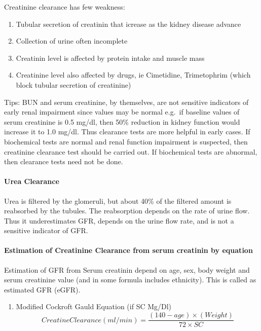 \documentclass[
  letterpaper,
  DIV=11,
  numbers=noendperiod]{scrreprt}
\let\oldparagraph\paragraph
\renewcommand{\paragraph}[1]{\oldparagraph{#1}\mbox{}}
\providecommand{\tightlist}{%
  \setlength{\itemsep}{0pt}\setlength{\parskip}{0pt}}\usepackage{longtable,booktabs,array}
\begin{document}
Creatinine clearance has few weakness:

\begin{enumerate}
\def\labelenumi{\arabic{enumi}.}
\item
  Tubular secretion of creatinin that icrease as the kidney disease
  advance
\item
  Collection of urine often incomplete
\item
  Creatinin level is affected by protein intake and muscle mass
\item
  Creatinine level also affected by drugs, ie Cimetidine, Trimetophrim
  (which block tubular secretion of creatinine)
\end{enumerate}

Tips: BUN and serum creatinine, by themselves, are not sensitive
indicators of early renal impairment since values may be normal e.g.~if
baseline values of serum creatinine is 0.5 mg/dl, then 50\% reduction in
kidney function would increase it to 1.0 mg/dl. Thus clearance tests are
more helpful in early cases. If biochemical tests are normal and renal
function impairment is suspected, then creatinine clearance test should
be carried out. If biochemical tests are abnormal, then clearance tests
need not be done.

\paragraph{Urea Clearance}\label{urea-clearance}

Urea is filtered by the glomeruli, but about 40\% of the filtered amount
is reabsorbed by the tubules. The reabsorption depends on the rate of
urine flow. Thus it underestimates GFR, depends on the urine flow rate,
and is not a sensitive indicator of GFR.

\paragraph{Estimation of Creatinine Clearance from serum creatinin by
equation}\label{estimation-of-creatinine-clearance-from-serum-creatinin-by-equation}

Estimation of GFR from Serum creatinin depend on age, sex, body weight
and serum creatinine value (and in some formula includes ethnicity).
This is called as estimated GFR (eGFR).

\begin{enumerate}
\def\labelenumi{\arabic{enumi}.}
\tightlist
\item
  Modified Cockroft Gauld Equation (if SC Mg/Dl) \[
  Creatine Clearance (ml/min) = \frac{(140 - age) \times (Weight) }{72 \times SC} 
  \]
\end{enumerate}
\end{document}
